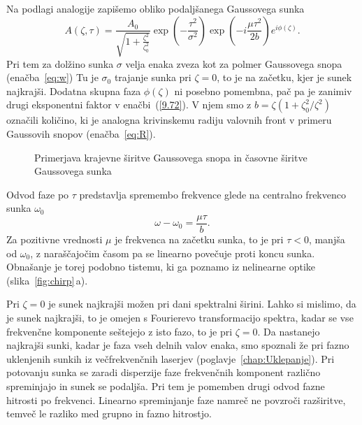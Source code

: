 Na podlagi analogije zapišemo obliko podaljšanega Gaussovega sunka
\begin{equation}
A\left(\zeta,\tau\right)=\frac{A_{0}}{\sqrt{1+\frac{\zeta^{2}
}{\zeta_{0}^{2}}}}\exp\left(-\frac{\tau^{2}}{\sigma^{2}}\right)\exp
\left(-i\frac{\mu\tau^{2}}{2b}\right)e^{i\phi\left(\zeta\right)}.
\label{9.72}
\end{equation}
Pri tem za dolžino sunka $\sigma$ velja enaka zveza kot za polmer 
Gaussovega snopa (enačba~\ref{eq:w})
Tu je $\sigma_{0}$ trajanje sunka pri $\zeta=0$, to je na začetku,
kjer je sunek najkrajši. Dodatna skupna faza $\phi\left(\zeta\right)$
ni posebno pomembna, pač pa je zanimiv drugi eksponentni faktor v
enačbi~(\ref{9.72}). V njem smo z $b=\zeta\left(1+\zeta_{0}^{2}/\zeta^{2}\right)$
označili količino, ki je analogna krivinskemu radiju valovnih front
v primeru Gaussovih snopov (enačba~\ref{eq:R}).
\begin{figure}[h]
\centering
\def\svgwidth{110truemm} 

\caption{Primerjava krajevne širitve Gaussovega snopa in časovne širitve Gaussovega sunka}
\label{fig:Gausstau}
\end{figure}

Odvod faze po $\tau$ predstavlja spremembo
frekvence glede na centralno frekvenco sunka $\omega_{0}$
\begin{equation}
\omega-\omega_{0}=\frac{\mu\tau}{b}.
\label{9.74}
\end{equation}
Za pozitivne vrednosti $\mu$ je frekvenca na začetku sunka,
to je pri $\tau<0$, manjša od $\omega_0$, z naraščajočim časom pa se 
linearno povečuje proti koncu sunka. Obnašanje je torej podobno tistemu, 
ki ga poznamo iz nelinearne optike
(slika~\ref{fig:chirp}\,a). 

\begin{remark}
Pri $\zeta=0$ je sunek najkrajši možen pri dani spektralni
širini. Lahko si mislimo, da je sunek najkrajši,
to je omejen s Fourierevo transformacijo spektra, kadar se
vse frekvenčne komponente seštejejo z isto fazo, to je pri $\zeta=0$.
Da nastanejo najkrajši sunki, kadar je faza vseh delnih valov enaka,
smo spoznali že pri fazno uklenjenih sunkih iz večfrekvenčnih laserjev
(poglavje~\ref{chap:Uklepanje}).
Pri potovanju sunka se zaradi disperzije faze frekvenčnih komponent
različno spreminjajo in sunek se podaljša. Pri tem je pomemben  
drugi odvod fazne hitrosti po frekvenci. Linearno spreminjanje faze 
namreč ne povzroči razširitve, temveč le razliko med grupno in fazno hitrostjo.
\end{remark}

